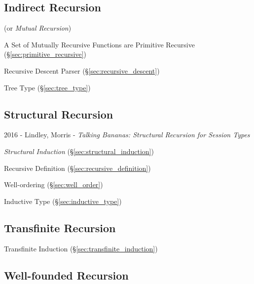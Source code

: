 \subsection{Indirect Recursion}\label{sec:indirect_recursion}

(or \emph{Mutual Recursion})

A Set of Mutually Recursive Functions are Primitive Recursive
(\S\ref{sec:primitive_recursive})

Recursive Descent Parser (\S\ref{sec:recursive_descent})

Tree Type (\S\ref{sec:tree_type})



\subsection{Structural Recursion}\label{sec:structural_recursion}

2016 - Lindley, Morris - \emph{Talking Bananas: Structural Recursion for Session
Types}



\emph{Structural Induction} (\S\ref{sec:structural_induction})

Recursive Definition (\S\ref{sec:recursive_definition})

Well-ordering (\S\ref{sec:well_order})

Inductive Type (\S\ref{sec:inductive_type})



\subsection{Transfinite Recursion}\label{sec:transfinite_recursion}

Transfinite Induction (\S\ref{sec:transfinite_induction})



\subsection{Well-founded Recursion}\label{sec:wellfounded_recursion}

